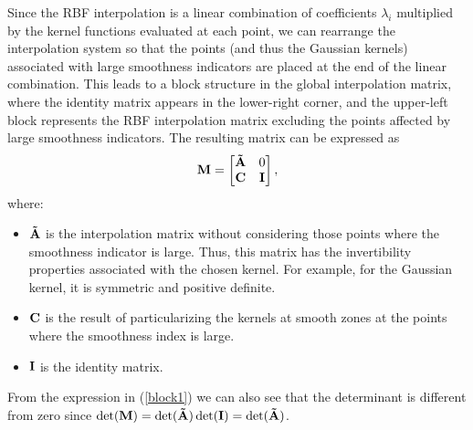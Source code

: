 \documentclass[preprint]{elsarticle}       %
\begin{document}
Since the RBF interpolation is a linear combination of coefficients $\lambda_i$ multiplied by the kernel functions evaluated at each point, we can rearrange the interpolation system so that the points (and thus the Gaussian kernels) associated with large smoothness indicators are placed at the end of the linear combination. This leads to a block structure in the global interpolation matrix, where the identity matrix appears in the lower-right corner, and the upper-left block represents the RBF interpolation matrix excluding the points affected by large smoothness indicators. The resulting matrix can be expressed as
\begin{equation}\label{block1}
{\bf M} = \begin{bmatrix}
{\bf \tilde A} & 0 \\
{\bf C} & {\bf I}
\end{bmatrix},
\end{equation}
where: 
\begin{itemize}
    \item ${\bf \tilde A}$ is the interpolation matrix without considering those points where the smoothness indicator is large. Thus, this matrix has the invertibility properties associated with the chosen kernel. For example, for the Gaussian kernel, it is symmetric and positive definite.
    \item ${\bf C}$ is the result of particularizing the kernels at smooth zones at the points where the smoothness index is large. 
    \item $\bf I$ is the identity matrix.
\end{itemize}

From the expression in (\ref{block1}) we can also see that the determinant is different from zero since $\det(\bf{M})=\det( \bf{\tilde{A}})\det(\bf{I})=\det( \bf{\tilde{A}})$.
\end{document}
